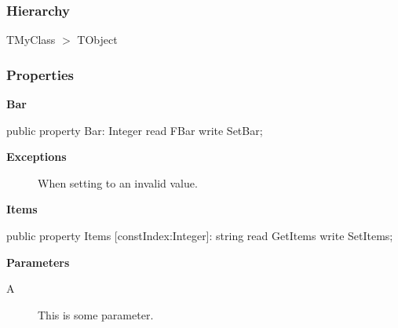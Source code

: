 \documentclass{report}
\newif\ifpdf
\begin{document}
\subsubsection*{\large{\textbf{Hierarchy}}\normalsize\hspace{1ex}\hfill}
TMyClass {$>$} TObject
\subsubsection*{\large{\textbf{Properties}}\normalsize\hspace{1ex}\hfill}
\begin{list}{}{
\setlength{\itemindent}{0cm}
\setlength{\listparindent}{0cm}
\setlength{\leftmargin}{\evensidemargin}
\addtolength{\leftmargin}{\tmplength}
\settowidth{\labelsep}{X}
\addtolength{\leftmargin}{\labelsep}
\setlength{\labelwidth}{\tmplength}
}
\label{A.TMyClass-Bar}
\item[\textbf{Bar}\hfill]
\ifpdf
\begin{flushleft}
\fi
\begin{ttfamily}
public property Bar: Integer read FBar write SetBar;\end{ttfamily}

\ifpdf
\end{flushleft}
\fi


\par  \par
\item[\textbf{Exceptions}]
\begin{description}
\item[\begin{ttfamily}TMyException\end{ttfamily}(\ref{A.TMyException})] When setting to an invalid value.
\end{description}
\label{A.TMyClass-Items}
\item[\textbf{Items}\hfill]
\ifpdf
\begin{flushleft}
\fi
\begin{ttfamily}
public property Items [constIndex:Integer]: string read GetItems write SetItems;\end{ttfamily}

\ifpdf
\end{flushleft}
\fi


\par  \par
\item[\textbf{Parameters}]
\begin{description}
\item[A] This is some parameter.
\end{description}
\end{list}
\end{document}
